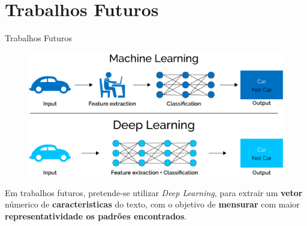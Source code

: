 \section{Trabalhos Futuros}
    \begin{frame}[fragile]{Trabalhos Futuros}
        \begin{figure}[H]
            \begin{center}
                \includegraphics[scale=0.50]{images/deep_learning.png}
            \end{center}
        \end{figure}
      Em trabalhos futuros, pretende-se utilizar \textit{Deep Learning}, para 
      extrair um \textbf{vetor} númerico de \textbf{caracteristicas} do texto, 
      com o objetivo de \textbf{mensurar} com maior \textbf{representatividade 
      os padrões encontrados}.
  \end{frame}